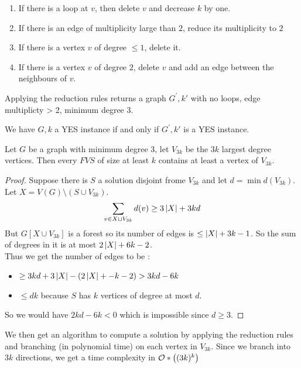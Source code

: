 \documentclass{cours}
\begin{document}
\begin{proposition}
    \begin{enumerate}
        \item If there is a loop at $v$, then delete $v$ and decrease $k$ by one.
        \item If there is an edge of multiplicity large than $2$, reduce its multiplicity to $2$
        \item If there is a vertex $v$ of degree $\leq 1$, delete it.
        \item If there is a vertex $v$ of degree $2$, delete $v$ and add an edge between the neighbours of $v$.
    \end{enumerate}
    Applying the reduction rules returns a graph $G^{'}, k'$ with no loops, edge multiplicty > 2, minimum degree $3$.

    We have $G, k$ a YES instance if and only if $G^{'}, k'$ is a YES instance.
\end{proposition}

\begin{lemma}
    Let $G$ be a graph with minimum degree $3$, let $V_{3k}$ be the $3k$ largest degree vertices. Then every $FVS$ of size at least $k$ contains at least a vertex of $V_{3k}$.
\end{lemma}
\begin{proof}
    Suppose there is $S$ a solution disjoint frome $V_{3k}$ and let $d = \min d(V_{3k})$. Let $X = V(G) \setminus \left(S \cup V_{3k}\right)$.
    \[
        \sum_{v \in X \sqcup V_{3k}} d(v) \geq 3 \left|X\right| + 3kd
    \]
    But $G[X \cup V_{3k}]$ is a forest so its number of edges is $\leq \left|X\right| + 3k - 1$. So the sum of degrees in it is at most $2\left|X\right| + 6k - 2$. \\
    Thus we get the number of edges to be :
    \begin{itemize}
        \item $\geq 3kd + 3\left|X\right| - \left(2 \left|X\right| + -k - 2\right) > 3kd - 6k$
        \item $\leq dk$ because $S$ has $k$ vertices of degree at most $d$.
    \end{itemize}
    So we would have $2kd - 6k < 0$ which is impossible since $d \geq 3$.
\end{proof}

We then get an algorithm to compute a solution by applying the reduction rules and branching (in polynomial time) on each vertex in $V_{3k}$. Since we branch into $3k$ directions, we get a time complexity in $\mathcal{O}*\left((3k)^{k}\right)$
\end{document}
